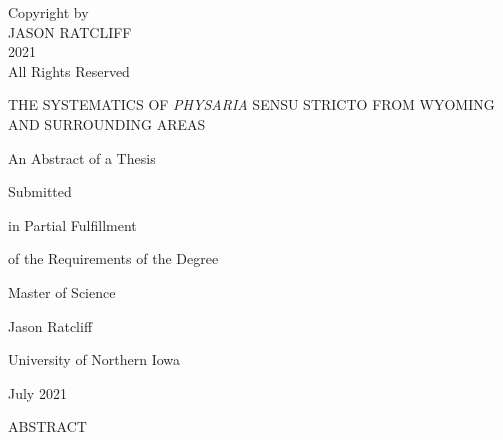 \thispagestyle{empty}
\vspace*{\fill}         %
\begin{center}
  Copyright by\\
  JASON RATCLIFF\\
  2021\\
  All Rights Reserved
\end{center}
\vspace*{\fill}
\clearpage

\clearpage
\thispagestyle{empty}
\begin{center}
THE SYSTEMATICS OF \textit{PHYSARIA} SENSU STRICTO FROM WYOMING
AND SURROUNDING AREAS
\end{center}
\vspace{120pt}
\begin{center}
  An Abstract of a Thesis

  Submitted

  in Partial Fulfillment

  of the Requirements of the Degree

  Master of Science
\end{center}
\vspace{120pt}
\begin{center}
  Jason Ratcliff

  University of Northern Iowa

  July 2021
\end{center}
\clearpage

\thispagestyle{empty}
\begin{center}
ABSTRACT
\end{center}

